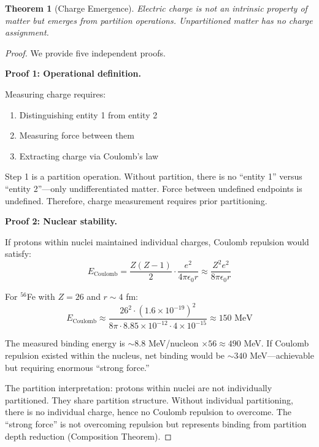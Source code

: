 \documentclass[twocolumn,10pt,a4paper]{article}
\newtheorem{theorem}{Theorem}[section]
\theoremstyle{definition}
\theoremstyle{remark}
\begin{document}
\begin{theorem}[Charge Emergence]
\label{thm:charge}
Electric charge is not an intrinsic property of matter but emerges from partition operations. Unpartitioned matter has no charge assignment.
\end{theorem}

\begin{proof}
We provide five independent proofs.

\textbf{Proof 1: Operational definition.}

Measuring charge requires:
\begin{enumerate}
    \item Distinguishing entity 1 from entity 2
    \item Measuring force between them
    \item Extracting charge via Coulomb's law
\end{enumerate}

Step 1 is a partition operation. Without partition, there is no ``entity 1'' versus ``entity 2''---only undifferentiated matter. Force between undefined endpoints is undefined. Therefore, charge measurement requires prior partitioning.

\textbf{Proof 2: Nuclear stability.}

If protons within nuclei maintained individual charges, Coulomb repulsion would satisfy:
\begin{equation}
    E_{\text{Coulomb}} = \frac{Z(Z-1)}{2} \cdot \frac{e^2}{4\pi\epsilon_0 r} \approx \frac{Z^2 e^2}{8\pi\epsilon_0 r}
\end{equation}

For $^{56}$Fe with $Z = 26$ and $r \sim 4$ fm:
\begin{equation}
    E_{\text{Coulomb}} \approx \frac{26^2 \cdot (1.6 \times 10^{-19})^2}{8\pi \cdot 8.85 \times 10^{-12} \cdot 4 \times 10^{-15}} \approx 150 \text{ MeV}
\end{equation}

The measured binding energy is $\sim 8.8$ MeV/nucleon $\times 56 \approx 490$ MeV. If Coulomb repulsion existed within the nucleus, net binding would be $\sim 340$ MeV---achievable but requiring enormous ``strong force.''

The partition interpretation: protons within nuclei are not individually partitioned. They share partition structure. Without individual partitioning, there is no individual charge, hence no Coulomb repulsion to overcome. The ``strong force'' is not overcoming repulsion but represents binding from partition depth reduction (Composition Theorem).


\end{proof}
\end{document}
